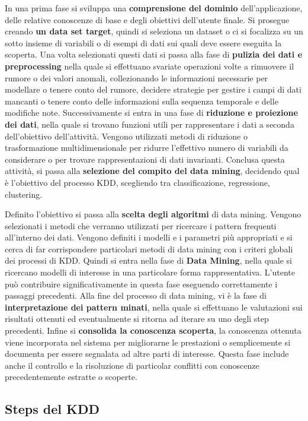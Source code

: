 \documentclass[a4paper]{extarticle}
\begin{document}
In una prima fase si sviluppa una \textbf{comprensione del dominio} dell'applicazione, delle relative conoscenze di base e degli obiettivi dell'utente finale. Si prosegue creando \textbf{un data set target}, quindi si seleziona un dataset o ci si focalizza su un sotto insieme di variabili o di esempi di dati sui quali deve essere eseguita la scoperta. Una volta selezionati questi dati si passa alla fase di \textbf{pulizia dei dati e preprocessing} nella quale si effettuano svariate operazioni volte a rimuovere il rumore o dei valori anomali, collezionando le informazioni necessarie per modellare o tenere conto del rumore, decidere strategie per gestire i campi di dati mancanti o tenere conto delle informazioni sulla sequenza temporale e delle modifiche note. Successivamente si entra in una fase di \textbf{riduzione e proiezione dei dati}, nella quale si trovano funzioni utili per rappresentare i dati a seconda dell'obiettivo dell'attività. Vengono utilizzati metodi di riduzione o trasformazione multidimensionale per ridurre l'effettivo numero di variabili da considerare o per trovare rappresentazioni di dati invarianti. Conclusa questa attività, si passa alla \textbf{selezione del compito del data mining}, decidendo qual è l'obiettivo del processo KDD, scegliendo tra classificazione, regressione, clustering. 

Definito l'obiettivo si passa alla \textbf{scelta degli algoritmi} di data mining. Vengono selezionati i metodi che verranno utilizzati per ricercare i pattern frequenti all'interno dei dati. Vengono definiti i modelli e i parametri più appropriati e si cerca di far corrispondere particolari metodi di data mining con i criteri globali dei processi di KDD. Quindi si entra nella fase di \textbf{Data Mining}, nella quale si ricercano modelli di interesse in una particolare forma rappresentativa.  L'utente può contribuire significativamente in questa fase eseguendo correttamente i passaggi precedenti. Alla fine del processo di data mining, vi è la fase di \textbf{interpretazione dei pattern minati}, nella quale si effettuano le valutazioni sui risultati ottenuti ed eventualmente si ritorna ad iterare su uno degli step precedenti. Infine si \textbf{consolida la conoscenza scoperta}, la conoscenza ottenuta viene incorporata nel sistema per migliorarne le prestazioni o semplicemente si documenta per essere segnalata ad altre parti di interesse. Questa fase include anche il controllo e la risoluzione di particolar conflitti con conoscenze precedentemente estratte o scoperte.

\subsection{Steps del KDD}
\end{document}
